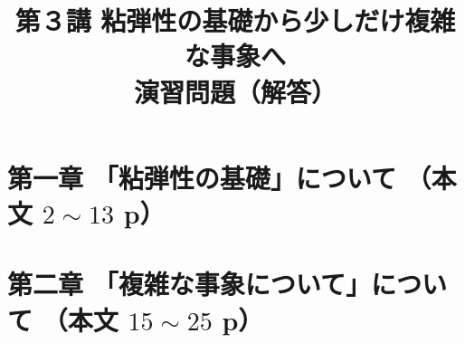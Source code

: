 \documentclass[uplatex,dvipdfmx,a4paper,11pt]{jsreport}
\title{第３講 粘弾性の基礎から少しだけ複雑な事象へ\\演習問題（解答）}
\author{}
\date{}
\begin{document}
\maketitle

\section*{第一章 「粘弾性の基礎」について （本文 $2\sim13$ p）}

\clearpage
\section*{第二章 「複雑な事象について」について （本文 $15\sim25$ p）}

\clearpage
\end{document}
